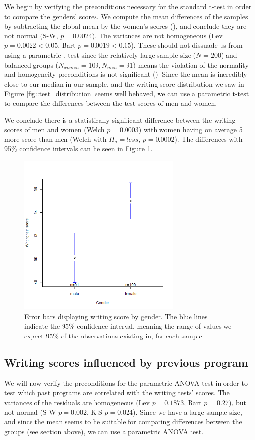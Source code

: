 \documentclass[10pt, a4paper]{article}
\begin{document}
	We begin by verifying the preconditions necessary for the standard t-test in order to compare the genders' scores. We compute the mean differences of the samples by subtracting the global mean by the women's scores (\textcite{means}), and conclude they are not normal (S-W, $p = 0.0024$). The variances are not homogeneous (Lev $p = 0.0022 < 0.05$, Bart $p = 0.0019 < 0.05$). These should not dissuade us from using a parametric t-test since the relatively large sample size ($N=200$) and balanced groups ($N_{women} = 109, N_{men} = 91$) means the violation of the normality and homogeneity preconditions is not significant (\textcite{variances}). Since the mean is incredibly close to our median in our sample, and the writing score distribution we saw in Figure \ref{fig::test_distribution} seems well behaved, we can use a parametric t-test to compare the differences between the test scores of men and women. 
	
	We conclude there is a statistically significant difference between the writing scores of men and women (Welch $p = 0.0003$) with women having on average 5 more score than men (Welch with $H_a = less$, $p = 0.0002$). The differences with 95\% confidence intervals can be seen in Figure \ref{fig::write_gender_error}.
	
	\begin{figure}
		\includegraphics[width=8cm]{writing_gender_error_plot.png}
		\centering
		\caption{Error bars displaying writing score by gender. The blue lines indicate the 95\% confidence interval, meaning the range of values we expect 95\% of the observations existing in, for each sample.}
		\label{fig::write_gender_error}
	\end{figure}
	
	
	\subsection{Writing scores influenced by previous program}
	We will now verify the preconditions for the parametric ANOVA test in order to test which past programs are correlated with the writing tests' scores. The variances of the residuals are homogeneous (Lev $p = 0.1873$, Bart $p = 0.27$), but not normal (S-W $p = 0.002$, K-S $p=0.024$). Since we have a large sample size, and since the mean seems to be suitable for comparing differences between the groups (see section above), we can use a parametric ANOVA test.
	
\end{document}
